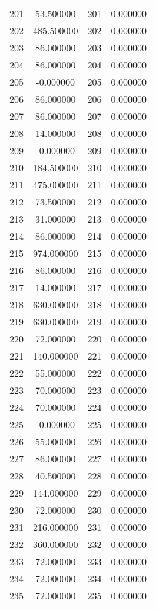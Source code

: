 \documentclass[12pt]{article}
\begin{document}
\begin{longtable}{@{}cccc@{}}
201 & 53.500000 & 201 & 0.000000 \\
202 & 485.500000 & 202 & 0.000000 \\
203 & 86.000000 & 203 & 0.000000 \\
204 & 86.000000 & 204 & 0.000000 \\
205 & -0.000000 & 205 & 0.000000 \\
206 & 86.000000 & 206 & 0.000000 \\
207 & 86.000000 & 207 & 0.000000 \\
208 & 14.000000 & 208 & 0.000000 \\
209 & -0.000000 & 209 & 0.000000 \\
210 & 184.500000 & 210 & 0.000000 \\
211 & 475.000000 & 211 & 0.000000 \\
212 & 73.500000 & 212 & 0.000000 \\
213 & 31.000000 & 213 & 0.000000 \\
214 & 86.000000 & 214 & 0.000000 \\
215 & 974.000000 & 215 & 0.000000 \\
216 & 86.000000 & 216 & 0.000000 \\
217 & 14.000000 & 217 & 0.000000 \\
218 & 630.000000 & 218 & 0.000000 \\
219 & 630.000000 & 219 & 0.000000 \\
220 & 72.000000 & 220 & 0.000000 \\
221 & 140.000000 & 221 & 0.000000 \\
222 & 55.000000 & 222 & 0.000000 \\
223 & 70.000000 & 223 & 0.000000 \\
224 & 70.000000 & 224 & 0.000000 \\
225 & -0.000000 & 225 & 0.000000 \\
226 & 55.000000 & 226 & 0.000000 \\
227 & 86.000000 & 227 & 0.000000 \\
228 & 40.500000 & 228 & 0.000000 \\
229 & 144.000000 & 229 & 0.000000 \\
230 & 72.000000 & 230 & 0.000000 \\
231 & 216.000000 & 231 & 0.000000 \\
232 & 360.000000 & 232 & 0.000000 \\
233 & 72.000000 & 233 & 0.000000 \\
234 & 72.000000 & 234 & 0.000000 \\
235 & 72.000000 & 235 & 0.000000 \\

\end{longtable}
\end{document}
